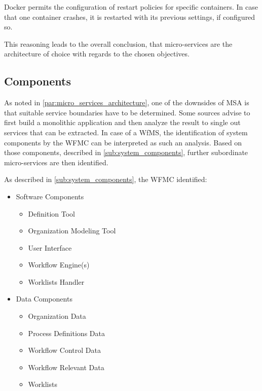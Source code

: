     Docker permits the configuration of restart policies for specific containers. In case that one container crashes, it is restarted with its previous settings, if configured so.

    This reasoning leads to the overall conclusion, that micro-services are the architecture of choice with regards to the chosen objectives.


\subsection{Components} %
\label{sub:components}
  As noted in \ref{par:micro_services_architecture}, one of the downsides of \ac{MSA} is that suitable service boundaries have to be determined. Some sources advise to first build a monolithic application and then analyze the result to single out services that can be extracted. In case of a \ac{WfMS}, the identification of system components by the \ac{WFMC} can be interpreted as such an analysis. Based on those components, described in \ref{sub:system_components}, further subordinate micro-services are then identified.

  As described in \ref{sub:system_components}, the \ac{WFMC} identified:
    \begin{itemize}[nosep]
      \item Software Components
        \begin{itemize}[nosep]
          \item Definition Tool
          \item Organization Modeling Tool
          \item User Interface
          \item Workflow Engine(s)
          \item Worklists Handler
        \end{itemize}
      \item Data Components
        \begin{itemize}[nosep]
          \item Organization Data
          \item Process Definitions Data
          \item Workflow Control Data
          \item Workflow Relevant Data
          \item Worklists
        \end{itemize}
    \end{itemize}

